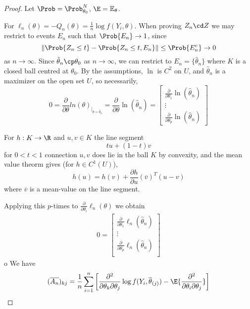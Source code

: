 \begin{proof}
  Let $\Prob = \Prob_{\theta_{0}}^{N}$, $\E = \mathbb{E}_{\theta}$.

  For $\ell_{n}(\theta) = -Q_{n}(\theta) = \frac{1}{n} \log f(Y_{i},
  \theta)$.  When proving $Z_{n} \cd Z$ we may restrict to events
  $E_{n}$ such that $\Prob{E_{n}} \rightarrow 1$, since
  \begin{equation}
    \label{eq:61}
    \| \Prob{Z_{n} \leq t}- \Prob{Z_{n} \leq t, E_{n}} \| \leq
    \Prob{E_{n}^{c}} \rightarrow 0
  \end{equation} as $n \rightarrow \infty$.  Since $\hat \theta_{n}
  \cp \theta_{0}$ as $n \rightarrow \infty$, we can restrict to $E_{n}
  = \{ \hat \theta_{n} \}$ where $K$ is a closed ball centred at
  $\theta_{0}$.  By the assumptions, $\ln$ is $C^{2}$ on $U$, and
  $\hat \theta_{n}$ is a maximizer on the open set $U$, so necessarily,
  \begin{equation}
    \label{eq:62}
    0 = \frac{\partial}{\partial \theta} ln(\theta)_{|_{\theta = \hat \theta_{n}}} =
    \frac{\partial}{\partial \theta} \ln (\hat \theta_{n}) =
    \begin{bmatrix}
      \frac{\partial}{\partial \theta_{1}} \ln (\hat \theta_{n}) \\
      \vdots \\
      \frac{\partial}{\partial \theta_{p}} \ln (\hat \theta_{n})
    \end{bmatrix}
  \end{equation}

  For $h: K \rightarrow \R$ and $u, v \in K$ the line segment
  \begin{equation}
    \label{eq:63}
    tu + (1-t)v
  \end{equation} for $0 < t < 1$ connection $u, v$ does lie in the
  ball $K$ by convexity, and the mean value theorm gives (for $h \in
  C^{1}(U)$),
  \begin{equation}
    \label{eq:64}
    h(u) = h(v) + \frac{\partial h}{\partial u} (\overline v)^{T} (u-v)
  \end{equation} where $\overline v$ is a mean-value on the line
  segment.

  Applying this $p$-times to $\frac{\partial}{\partial \theta_{i}}
  \ell_{n}(\theta)$ we obtain
  \begin{align}
    \label{eq:65}
    0 =
    \begin{bmatrix}
      \frac{\partial}{\partial \theta_{1}} \ell_{n}(\hat \theta_{n})  \\
      \vdots \\
      \frac{\partial}{\partial \theta_{p}} \ell_{n}(\hat \theta_{n})  \\
    \end{bmatrix} 
  \end{align} 
o
  We have
  \begin{align}
    \label{eq:66}
    (\overline{A_{n}})_{kj} = \frac{1}{n} \sum_{i=1}^{n} \left[
    \frac{\partial^{2}}{\partial \theta_{k} \partial \theta_{j}} \log
    f(Y_{i}, \overline{\theta}_{(j)}) -
    \E{\frac{\partial^{2}}{\partial \theta_{i} \partial \theta_{j}}} \right]
  \end{align}
\end{proof}

